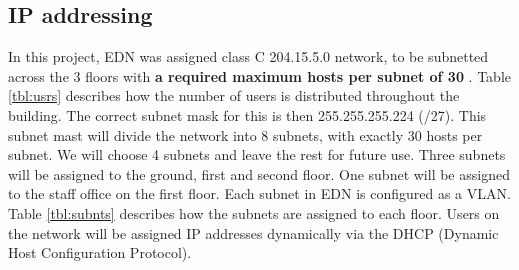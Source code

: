 \documentclass[ a4, 12pt, onecolumn]{IEEEtran}
\begin{document}
\subsection{IP addressing}
In this project, EDN was assigned class C 204.15.5.0 network, to be subnetted across the 3 floors with \textbf{a required maximum hosts per subnet of 30	}. Table \ref{tbl:usrs} describes how the number of users is distributed throughout the building. The correct subnet mask for this is then 255.255.255.224 (/27). This subnet mast will divide the network into 8 subnets, with exactly 30 hosts per subnet. We will choose 4 subnets and leave the rest for future use. Three subnets will be assigned to the ground, first and second floor. One subnet will be assigned to the staff office on the first floor. Each subnet in EDN is configured as a VLAN. Table \ref{tbl:subnts} describes how the subnets are assigned to each floor.
Users on the network will be assigned IP addresses dynamically via the DHCP (Dynamic Host Configuration Protocol).
\begin{table}[h!]
\caption{Distribution of users in each floor of the ED building}
\label{tbl:usrs}
\end{table}

\begin{table}[h!]
\caption{Subnet and VLAN per floor}
\label{tbl:subnts}
\end{table}
\clearpage 
\end{document}
